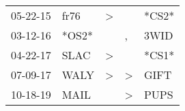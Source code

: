 \begin{supertabular}{p{0.07\textwidth}p{0.06\textwidth}p{0.02\textwidth}p{0.02\textwidth}p{0.06\textwidth}}
 05-22-15\textsuperscript{} &  fr76\textsuperscript{} &  \textgreater &               &                   *CS2* \\
 03-12-16\textsuperscript{} &                   *OS2* &               &             , &  3WID\textsuperscript{} \\
 04-22-17\textsuperscript{} &  SLAC\textsuperscript{} &  \textgreater &               &                   *CS1* \\
 07-09-17\textsuperscript{} &  WALY\textsuperscript{} &  \textgreater &  \textgreater &  GIFT\textsuperscript{} \\
 10-18-19\textsuperscript{} &  MAIL\textsuperscript{} &               &  \textgreater &  PUPS\textsuperscript{} \\
\end{supertabular}
